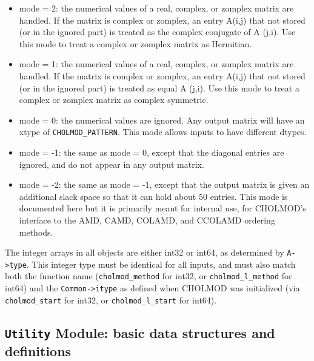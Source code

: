 \documentclass[11pt]{article}
\begin{document}
    \begin{itemize}
    \item
    mode = 2:   the numerical values of a real, complex, or zomplex matrix are
                handled.  If the matrix is complex or zomplex, an entry A(i,j)
                that not stored (or in the ignored part) is treated as the
                complex conjugate of A (j,i).  Use this mode to treat a
                complex or zomplex matrix as Hermitian.

    \item
    mode = 1:   the numerical values of a real, complex, or zomplex matrix are
                handled.  If the matrix is complex or zomplex, an entry A(i,j)
                that not stored (or in the ignored part) is treated as equal A
                (j,i).  Use this mode to treat a complex or zomplex matrix as
                complex symmetric.

    \item
    mode = 0:   the numerical values are ignored.  Any output matrix will have
                an xtype of \verb'CHOLMOD_PATTERN'.  This mode allows inputs to
                have different dtypes.

    \item
    mode = -1:  the same as mode = 0, except that the diagonal entries are
                ignored, and do not appear in any output matrix.

    \item
    mode = -2:  the same as mode = -1, except that the output matrix is given an
                additional slack space so that it can hold about 50%
                entries.  This mode is documented here but it is primarily
                meant for internal use, for CHOLMOD's interface to the AMD,
                CAMD, COLAMD, and CCOLAMD ordering methods.
    \end{itemize}

   The integer arrays in all objects are either int32 or int64, as determined
   by \verb'A->type'.  This integer type must be identical for all inputs, and
   must also match both the function name (\verb'cholmod_method' for int32, or
   \verb'cholmod_l_method' for int64) and the \verb'Common->itype' as defined
   when CHOLMOD was initialized (via \verb'cholmod_start' for int32, or
   \verb'cholmod_l_start' for int64).

\subsection{{\tt Utility} Module: basic data structures and
definitions}
\end{document}

